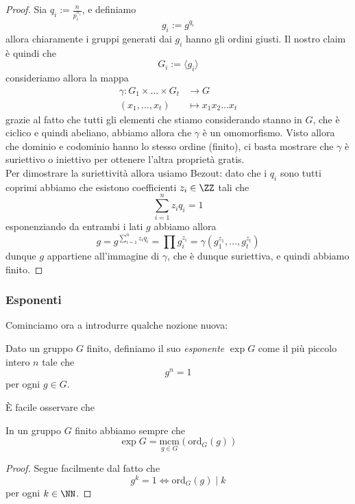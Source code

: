 \documentclass[11pt]{scrartcl}
\newcommand{\ordine}[2]{\text{ord}_{#1}\left(#2\right)}
\renewcommand{\mcm}{\text{mcm}}
\begin{document}
	\begin{proof}
		Sia $q_i:=\frac{n}{p_i^{n_i}}$, e definiamo
		$$g_i:=g^{q_i}$$
		allora chiaramente i gruppi generati dai $g_i$ hanno gli ordini giusti. Il nostro claim è quindi che
		$$G_i:=\langle g_i\rangle$$
		consideriamo allora la mappa
		\begin{align*}
			\gamma:G_1\times \dots \times G_t & \to G \\
			(x_1,\dots,x_t) & \mapsto x_1x_2\dots x_t
		\end{align*}
		grazie al fatto che tutti gli elementi che stiamo considerando stanno in $G$, che è ciclico e quindi abeliano, abbiamo allora che $\gamma$ è un omomorfismo. Visto allora che dominio e codominio hanno lo stesso ordine (finito), ci basta mostrare che $\gamma$ è suriettivo o iniettivo per ottenere l'altra proprietà gratis. \\
		Per dimostrare la suriettività allora usiamo Bezout: dato che i $q_i$ sono tutti coprimi abbiamo che esistono coefficienti $z_i\in \ZZ$ tali che
		$$\sum_{i=1}^{n}z_iq_i=1$$
		esponenziando da entrambi i lati $g$ abbiamo allora
		$$g=g^{\sum_{i=1}^{n}z_iq_i}=\prod g_i^{z_i}=\gamma\left(g_1^{z_1},\dots,g_t^{z_t}\right)$$
		dunque $g$ appartiene all'immagine di $\gamma$, che è dunque suriettiva, e quindi abbiamo finito.
	\end{proof}
	
	\subsubsection{Esponenti}
	
	Cominciamo ora a introdurre qualche nozione nuova:
	
	\begin{definition}
		Dato un gruppo $G$ finito, definiamo il suo \textit{esponente} $\exp G$ come il più piccolo intero $n$ tale che 
		$$g^n=1$$
		per ogni $g\in G$.
	\end{definition}
	\`E facile osservare che 
	\begin{proposition}
		In un gruppo $G$ finito abbiamo sempre che
		$$\exp G= \underset{g\in G}{\mcm}(\ordine{G}{g})$$
	\end{proposition}
	\begin{proof}
		Segue facilmente dal fatto che 
		$$g^k=1 \iff \ordine{G}{g}\mid k$$
		per ogni $k\in \NN$.
	\end{proof}
	
\end{document}
